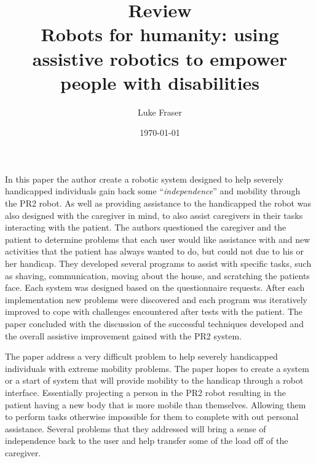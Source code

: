 \documentclass{article}
\begin{document}
\title{{\large Review} \\ Robots for humanity: using assistive robotics to empower people with disabilities}
\author{Luke Fraser}
\date{\today}
\maketitle

\begingroup
\renewcommand{\section}[2]{}


\endgroup

\section*{Summary}
In this paper the author create a robotic system designed to help severely handicapped individuals gain back some ``\emph{independence}'' and mobility through the PR2 robot. As well as providing assistance to the handicapped the robot was also designed with the caregiver in mind, to also assist caregivers in their tasks interacting with the patient. The authors questioned the caregiver and the patient to determine problems that each user would like assistance with and new activities that the patient has always wanted to do, but could not due to his or her handicap. They developed several programs to assist with specific tasks, such as shaving, communication, moving about the house, and scratching the patients face. Each system was designed based on the questionnaire requests. After each implementation new problems were discovered and each program was iteratively improved to cope with challenges encountered after tests with the patient. The paper concluded with the discussion of the successful techniques developed and the overall assistive improvement gained with the PR2 system.
\section*{Strengths}
The paper address a very difficult problem to help severely handicapped individuals with extreme mobility problems. The paper hopes to create a system or a start of system that will provide mobility to the handicap through a robot interface. Essentially projecting a person in the PR2 robot resulting in the patient having a new body that is more mobile than themselves. Allowing them to perform tasks otherwise impossible for them to complete with out personal assistance. Several problems that they addressed will bring a sense of independence back to the user and help transfer some of the load off of the caregiver.
\end{document}

